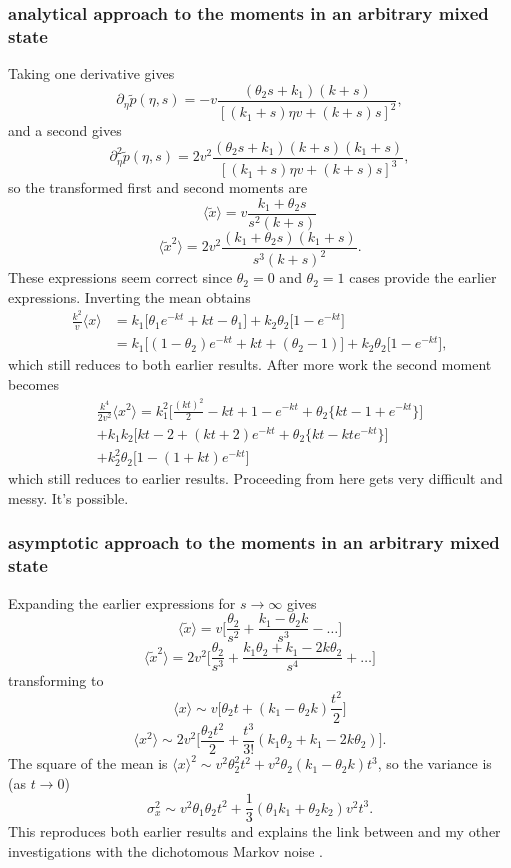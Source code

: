 \documentclass[11pt]{article}
\newcommand\be{\begin{equation}} %
\newcommand\ee{\end{equation}}   %
\newcommand\bra{\langle}
\newcommand\ket{\rangle}
\begin{document}
\subsubsection{analytical approach to the moments in an arbitrary mixed state}
Taking one derivative gives
\be \partial_\eta \tilde{p}(\eta,s) = -v \frac{(\theta_2s + k_1)(k+s)}{[(k_1+s) \eta v  + (k+s)s]^2}, \ee
and a second gives
\be \partial_\eta^2 \tilde{p}(\eta,s) = 2v^2 \frac{(\theta_2s + k_1)(k+s)(k_1+s)}{[(k_1+s) \eta v  + (k+s)s]^3}, \ee
so the transformed first and second moments are 
\be \bra \tilde{x} \ket = v \frac{k_1 + \theta_2s}{s^2(k+s)}\ee
\be \bra \tilde{x}^2 \ket = 2v^2 \frac{(k_1 + \theta_2s)(k_1+s)}{s^3 (k+s)^2}.\ee
These expressions seem correct since $\theta_2=0$ and $\theta_2=1$ cases provide the earlier expressions.
Inverting the mean obtains
\begin{align} \frac{k^2}{v}\bra x \ket &= k_1 \Big[\theta_1 e^{-kt} + kt - \theta_1 \Big] + k_2 \theta_2 \Big[1-e^{-kt}\Big] \\
&= k_1 \Big[(1-\theta_2) e^{-kt} + kt + (\theta_2-1) \Big] + k_2 \theta_2 \Big[1-e^{-kt}\Big],
\end{align}
which still reduces to both earlier results.
After more work the second moment becomes
\begin{multline} \frac{k^4}{2v^2}\bra x^2 \ket = k_1^2 \Big[\frac{(kt)^2}{2} -kt + 1 - e^{-kt} + \theta_2\big\{k t -1 + e^{-kt}\big\}\Big] \\+ k_1k_2\Big[kt-2+(kt+2)e^{-kt} + \theta_2\big\{kt - kte^{-kt}\big\}\Big] \\+ k_2^2\theta_2\Big[1-(1+kt)e^{-kt}\Big]\end{multline}
which still reduces to earlier results.
Proceeding from here gets very difficult and messy. It's possible.
\subsubsection{asymptotic approach to the moments in an arbitrary mixed state}
Expanding the earlier expressions for $s \rightarrow \infty$ gives
\be \bra \tilde{x} \ket = v \Big[\frac{\theta_2}{s^2} + \frac{k_1-\theta_2 k}{s^3}-\dots\Big]
\ee
\be \bra \tilde{x}^2 \ket = 2v^2\Big[\frac{\theta_2}{s^3} + \frac{k_1\theta_2 + k_1 - 2k\theta_2}{s^4}+\dots\Big]\ee
transforming to 
\be \bra x \ket \sim v \Big[\theta_2 t + (k_1-\theta_2 k)\frac{t^2}{2}\Big]
\ee
\be \bra x^2 \ket \sim 2v^2 \Big[\frac{\theta_2t^2}{2} + \frac{t^3}{3!}(k_1\theta_2 + k_1 - 2k\theta_2)\Big].
\ee
The square of the mean is $\bra x \ket^2 \sim v^2\theta_2^2 t^2 + v^2\theta_2(k_1-\theta_2 k)t^3$,
so the variance is (as $t \rightarrow 0$)
\be \sigma_x^2 \sim v^2 \theta_1 \theta_2 t^2 + \frac{1}{3}(\theta_1 k_1 + \theta_2 k_2)v^2t^3.\ee
This reproduces both earlier results and explains the link between \citet{Lisle1998} and my other investigations with the dichotomous Markov noise \citep[e.g.][]{Horsthemke1984, Bena2006}.
\end{document}
